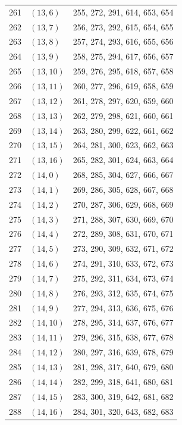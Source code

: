 \documentclass{article}
\begin{document}
\begin{longtable}{lll}
  261 & \((13, 6)\) & 255, 272, 291, 614, 653, 654 \\
  262 & \((13, 7)\) & 256, 273, 292, 615, 654, 655 \\
  263 & \((13, 8)\) & 257, 274, 293, 616, 655, 656 \\
  264 & \((13, 9)\) & 258, 275, 294, 617, 656, 657 \\
  265 & \((13, 10)\) & 259, 276, 295, 618, 657, 658 \\
  266 & \((13, 11)\) & 260, 277, 296, 619, 658, 659 \\
  267 & \((13, 12)\) & 261, 278, 297, 620, 659, 660 \\
  268 & \((13, 13)\) & 262, 279, 298, 621, 660, 661 \\
  269 & \((13, 14)\) & 263, 280, 299, 622, 661, 662 \\
  270 & \((13, 15)\) & 264, 281, 300, 623, 662, 663 \\
  271 & \((13, 16)\) & 265, 282, 301, 624, 663, 664 \\
  272 & \((14, 0)\) & 268, 285, 304, 627, 666, 667 \\
  273 & \((14, 1)\) & 269, 286, 305, 628, 667, 668 \\
  274 & \((14, 2)\) & 270, 287, 306, 629, 668, 669 \\
  275 & \((14, 3)\) & 271, 288, 307, 630, 669, 670 \\
  276 & \((14, 4)\) & 272, 289, 308, 631, 670, 671 \\
  277 & \((14, 5)\) & 273, 290, 309, 632, 671, 672 \\
  278 & \((14, 6)\) & 274, 291, 310, 633, 672, 673 \\
  279 & \((14, 7)\) & 275, 292, 311, 634, 673, 674 \\
  280 & \((14, 8)\) & 276, 293, 312, 635, 674, 675 \\
  281 & \((14, 9)\) & 277, 294, 313, 636, 675, 676 \\
  282 & \((14, 10)\) & 278, 295, 314, 637, 676, 677 \\
  283 & \((14, 11)\) & 279, 296, 315, 638, 677, 678 \\
  284 & \((14, 12)\) & 280, 297, 316, 639, 678, 679 \\
  285 & \((14, 13)\) & 281, 298, 317, 640, 679, 680 \\
  286 & \((14, 14)\) & 282, 299, 318, 641, 680, 681 \\
  287 & \((14, 15)\) & 283, 300, 319, 642, 681, 682 \\
  288 & \((14, 16)\) & 284, 301, 320, 643, 682, 683 \\

\end{longtable}
\end{document}
